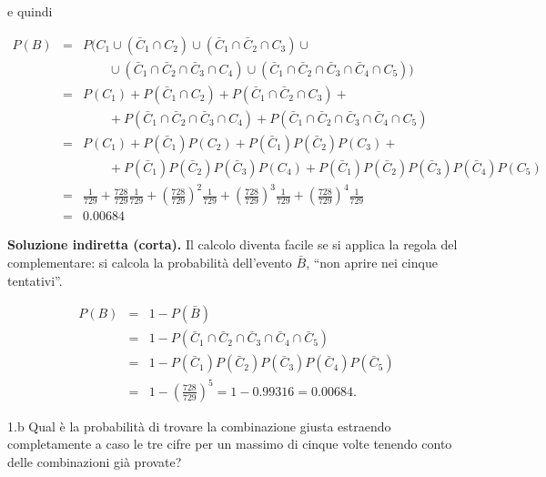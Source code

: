 \documentclass[
  11pt,
]{book}
\theoremstyle{mytheoremstyle}
\theoremstyle{mydefstyle}
\newenvironment{sol}
  {
  \begin{tcolorbox}[enhanced,breakable,arc=0.1mm,boxrule=1pt,colback=white,colframe=iblue,
  title=\bf \fontfamily{lmss}\selectfont \hspace{.5 cm} Soluzione,drop fuzzy shadow]

}{
\end{tcolorbox}
  }
\begin{document}
\begin{sol}
e quindi

\[\begin{array}{lll}
P(B)   &=&  P\Big(C_1\cup (\bar C_1\cap C_2) \cup (\bar C_1\cap \bar C_2\cap C_3)\cup \\
&& \qquad\cup(\bar C_1\cap \bar C_2\cap \bar C_3\cap C_4)\cup (\bar C_1\cap \bar C_2\cap \bar C_3\cap\bar C_4\cap C_5)\Big)\\
&=& P(C_1)+P(\bar C_1\cap C_2)+P(\bar C_1\cap \bar C_2\cap C_3)+\\
&&\qquad + P(\bar C_1\cap \bar C_2\cap \bar C_3\cap C_4)+P(\bar C_1\cap \bar C_2\cap \bar C_3\cap\bar C_4\cap C_5)\\
&=& P(C_1)+P(\bar C_1) P( C_2)+P(\bar C_1) P( \bar C_2) P( C_3)+ \\
&&\qquad+P(\bar C_1) P( \bar C_2) P( \bar C_3) P( C_4)+P(\bar C_1) P( \bar C_2) P( \bar C_3) P(\bar C_4) P( C_5)\\
&=& \frac 1{729} + \frac {728}{729}\frac {1}{729} + \left(\frac {728}{729}\right)^2\frac {1}{729}
+ \left(\frac {728}{729}\right)^3\frac {1}{729}+ \left(\frac {728}{729}\right)^4\frac {1}{729}\\
&=& 0.00684
\end{array}\]

\textbf{Soluzione indiretta (corta).}
Il calcolo diventa facile se si applica la regola del complementare:
si calcola la probabilità dell'evento \(\bar{B}\), ``non aprire nei
cinque tentativi''.

\begin{eqnarray*}
P(B)&=& 1 - P(\bar{B}) \\
    &=& 1 - P(\bar{C}_{1} \cap \bar{C}_{2} \cap \bar{C}_{3} \cap
              \bar{C}_{4} \cap \bar{C}_{5}) \\
    &=& 1 - P(\bar{C}_{1}) P(\bar{C}_{2}) P(\bar{C}_{3}) 
            P(\bar{C}_{4}) P(\bar{C}_{5}) \\
    &=& 1 - \left( \frac{728} {729} \right)^{5}
     =  1 - 0.99316 = 0.00684  .
\end{eqnarray*}

\end{sol}

1.b Qual è la probabilità di trovare la combinazione giusta
estraendo completamente a caso le tre cifre per un massimo di
cinque volte tenendo conto delle combinazioni già provate?
\end{document}
